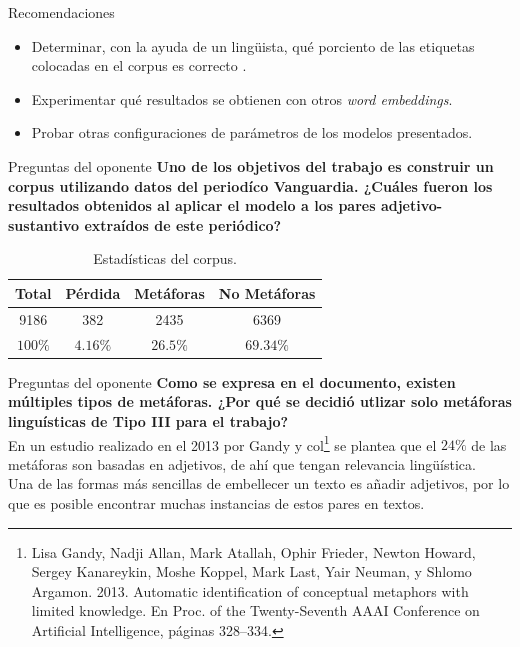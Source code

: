 \documentclass[12pt]{beamer}
\begin{document}
\begin{frame}{Recomendaciones}
\begin{itemize}
\item Determinar, con la ayuda de un lingüista, qué porciento de las etiquetas colocadas en el corpus es correcto .
\item Experimentar qué resultados se obtienen con otros \textit{word embeddings}.
\item Probar otras configuraciones de parámetros de los modelos presentados.
\end{itemize}
\end{frame}
\begin{frame}
\titlepage
\end{frame}

\begin{frame}{Preguntas del oponente}
\textbf{Uno de los objetivos del trabajo es construir un corpus utilizando datos del periodíco Vanguardia. ¿Cuáles fueron los resultados obtenidos al aplicar el modelo a los pares adjetivo-sustantivo extraídos de este periódico?}
\begin{table}[htb]%
\centering
\begin{tabular}{c|c|c|c}
Total & Pérdida & Metáforas & No Metáforas \\
\hline
9186 & 382 & 2435 & 6369 \\
\hline
$100 \%$ & $4.16 \%$ & $26.5 \%$ & $69.34 \%$ \\
\hline
\end{tabular}
\caption{Estadísticas del corpus. \label{Tabla:3}}%
\end{table}
\end{frame}
\begin{frame}{Preguntas del oponente}
\textbf{Como se expresa en el documento, existen múltiples tipos de metáforas. ¿Por qué se decidió utlizar solo metáforas linguísticas de Tipo III para el trabajo?}\\
En un estudio realizado en el 2013 por Gandy y col\footnote{  Lisa Gandy, Nadji Allan, Mark Atallah, Ophir Frieder, Newton Howard, Sergey Kanareykin, Moshe Koppel, Mark Last, Yair Neuman, y Shlomo Argamon. 2013. Automatic identification of conceptual metaphors with limited knowledge. En Proc. of the Twenty-Seventh AAAI Conference on Artificial Intelligence, páginas 328–334.} se plantea que el $24\%$ de las metáforas son basadas en adjetivos, de ahí que tengan relevancia lingüística.\\
Una de las formas más sencillas de embellecer un texto es añadir adjetivos, por lo que es posible encontrar muchas instancias de estos pares en textos.
\end{frame}
\end{document}
